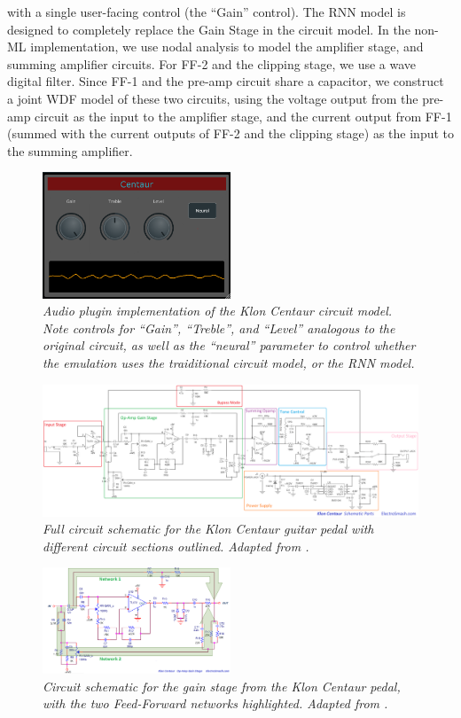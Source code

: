 \documentclass[twoside,a4paper]{article}
\begin{document}
with a single user-facing control (the ``Gain'' control). The RNN
model is designed to completely replace the Gain Stage in the circuit
model. In the non-ML implementation, we use nodal analysis to
model the amplifier stage, and summing amplifier circuits.
For FF-2 and the clipping stage, we use a wave digital filter.
Since FF-1 and the pre-amp circuit share a capacitor, we construct
a joint WDF model of these two circuits, using the voltage output
from the pre-amp circuit as the input to the amplifier stage, and
the current output from FF-1 (summed with the current outputs of
FF-2 and the clipping stage) as the input to the summing amplifier.
%
\begin{figure}
    \centering
    \includegraphics[width=0.5\textwidth]{Plugin.png}
    \caption{\label{fig:Plugin} {\it Audio plugin implementation
    of the Klon Centaur circuit model. Note controls for ``Gain'',
    ``Treble'', and ``Level'' analogous to the original circuit,
    as well as the ``neural'' parameter to control whether the
    emulation uses the traiditional circuit model, or the RNN model.}}
\end{figure}
%
\begin{figure}
    \centering
    \includegraphics[width=1.0\textwidth]{FullCircuit.png}
    \caption{\label{fig:fullcircuit} {\it Full circuit schematic
    for the Klon Centaur guitar pedal with different circuit
    sections outlined. Adapted from \cite{electrosmash}.}}
\end{figure}
%
\begin{figure}
    \centering
    \includegraphics[width=0.5\textwidth]{GainStageCircuit.png}
    \caption{\label{fig:gaincircuit} {\it Circuit schematic for the
    gain stage from the Klon Centaur pedal, with the two Feed-Forward
    networks highlighted. Adapted from \cite{electrosmash}.}}
\end{figure}
\end{document}

